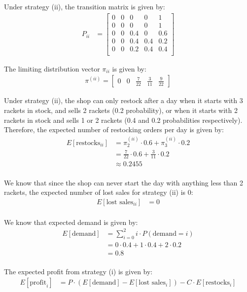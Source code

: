 \documentclass[12pt]{article}
\begin{document}
\begin{enumerate}
\begin{enumerate}
Under strategy (ii), the transition matrix is given by:
\begin{align*}
P_{ii} &= \begin{bmatrix}
0 & 0 & 0 & 0 & 1 \\
0 & 0 & 0 & 0 & 1 \\
0 & 0 & 0.4 & 0 & 0.6 \\
0 & 0 & 0.4 & 0.4 & 0.2 \\
0 & 0 & 0.2 & 0.4 & 0.4 \\
\end{bmatrix}
\end{align*}

The limiting distribution vector $\pi_{ii}$ is given by:
\begin{align*}
\pi^{(ii)} = 
\begin{bmatrix}
0 & 0 & \frac{7}{22} & \frac{3}{11} & \frac{9}{22}
\end{bmatrix}
\end{align*}

Under strategy (ii), the shop can only restock after a day when it starts with 3 rackets in stock, and sells 2 rackets (0.2 probability), or when it starts with 2 rackets in stock and sells 1 or 2 rackets (0.4 and 0.2 probabilities respectively). Therefore, the expected number of restocking orders per day is given by:
\begin{align*}
E[\text{restocks}_{ii}] &= \pi^{(ii)}_2 \cdot 0.6 + \pi^{(ii)}_3 \cdot 0.2 \\
&= \frac{7}{22} \cdot 0.6 + \frac{3}{11} \cdot 0.2 \\
&\approx 0.2455 \\
\end{align*}

We know that since the shop can never start the day with anything less than 2 rackets, the expected number of lost sales for strategy (ii) is 0:
\begin{align*}
E[\text{lost sales}_{ii}] &= 0 \\
\end{align*}

We know that expected demand is given by:
\begin{align*}
E[\text{demand}] &= \sum_{i=0}^{2} i \cdot P(\text{demand} = i) \\
&= 0 \cdot 0.4 + 1 \cdot 0.4 + 2 \cdot 0.2 \\
&= 0.8 \\
\end{align*}

The expected profit from strategy (i) is given by:
\begin{align*}
E[\text{profit}_i] &= P \cdot (E[\text{demand}] - E[\text{lost sales}_i]) - C \cdot E[\text{restocks}_i] \\
\end{align*}


\end{enumerate}
\end{enumerate}
\end{document}
